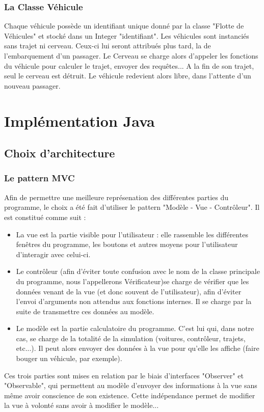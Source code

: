 \documentclass[a4paper, titlepage]{report}
\begin{document}
\section{La Classe Véhicule}

Chaque véhicule possède un identifiant unique donné par la classe "Flotte de Véhicules" et stocké  dans un Integer "identifiant". Les véhicules sont instanciés sans trajet ni cerveau. Ceux-ci lui seront attribués plus tard, la de l'embarquement d'un passager. Le Cerveau se charge alors d'appeler les fonctions du véhicule pour calculer le trajet, envoyer des requêtes...
A la fin de son trajet, seul le cerveau est détruit. Le véhicule  redevient alors libre, dans l'attente d'un nouveau passager.

\part{Implémentation Java}
\chapter{Choix d'architecture}
\section{Le pattern MVC}
Afin de permettre une meilleure représenation des différentes parties du programme, le choix a été fait d'utiliser le pattern "Modèle - Vue - Contrôleur". Il est constitué comme suit :\\
\begin{itemize}
\item La vue est la partie visible pour l'utilisateur : elle rassemble les différentes fenêtres du programme, les boutons et autres moyens pour l'utilisateur d'interagir avec celui-ci.
\item Le contrôleur (afin d'éviter toute confusion avec le nom de la classe principale du programme, nous l'appellerons Vérificateur)se charge de vérifier  que les données venant de la vue (et donc souvent de l'utilisateur), afin d'éviter l'envoi d'arguments non attendus aux fonctions internes. Il se charge par la suite de transmettre ces données au modèle.
\item Le modèle est la partie calculatoire du programme. C'est lui qui, dans notre cas, se charge de la totalité de la simulation (voitures, contrôleur, trajets, etc...). Il peut alors envoyer des données à la vue pour qu'elle les affiche (faire bouger un véhicule, par exemple).
\end{itemize}
Ces trois parties sont mises en relation par le biais d'interfaces "Observer" et "Observable", qui permettent au modèle d'envoyer des informations à la vue sans même avoir conscience de son existence. Cette indépendance permet de modifier la vue à volonté sans avoir à modifier le modèle...
\end{document}
